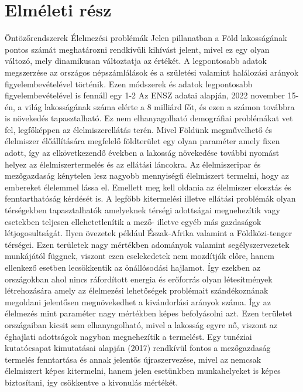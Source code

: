 \documentclass[a4paper,oneside,onecolumn,12pt]{LegrandOrangeBook}
\begin{document}
\chapter{Elméleti rész}
Öntözőrendszerek
Élelmezési problémák
	Jelen pillanatban a Föld lakosságának pontos számát meghatározni rendkívüli kihívást jelent, mivel ez egy olyan változó, mely dinamikusan változtatja az értékét. A legpontosabb adatok megszerzése az országos népszámlálások és a születési valamint halálozási arányok figyelembevételével történik. Ezen módszerek és adatok legpontosabb figyelembevételével is fennáll egy 1-2%
	Az ENSZ adatai alapján, 2022 november 15-én, a világ lakosságának száma elérte a 8 milliárd főt, és ezen a számon továbbra is növekedés tapasztalható. Ez nem elhanyagolható demográfiai problémákat vet fel, legfőképpen az élelmiszerellátás terén. 
	Mivel Földünk megművelhető és élelmiszer élőállítására megfelelő földterület egy olyan paraméter amely fixen adott, így az elkövetkezendő években a lakosság növekedése további nyomást helyez az élelmiszertermelés és az ellátási láncokra. Az élelmiszeripar és mezőgazdaság kénytelen lesz nagyobb mennyiségű élelmiszert termelni, hogy az embereket élelemmel lássa el. Emellett meg kell oldania az élelmiszer elosztás és fenntarthatóság kérdését is. 
	A legfőbb kitermelési illetve ellátási problémák olyan térségekben tapasztalhatók amelyeknek térségi adottságai megnehezítik vagy esetekben teljesen ellehetetlenítik a mező- illetve egyéb más gazdaságok létjogosultságát. Ilyen övezetek például Észak-Afrika valamint a Földközi-tenger térségei. Ezen területek nagy mértékben adományok valamint segélyszervezetek munkájától  függnek, viszont ezen cselekedetek nem mozdítják előre, hanem ellenkező esetben lecsökkentik az önállósodási hajlamot. Így ezekben az országokban ahol nincs ráfordított energia és erőforrás olyan létesítmények létrehozására amely az élelmezési lehetőségek problémait szándékoznának megoldani jelentősen megnövekedhet a kivándorlási arányok száma. Így az élelmezés mint paraméter nagy mértékben képes befolyásolni azt. Ezen területet országaiban kicsit sem  elhanyagolható, mivel a lakosság egyre nő, viszont az éghajlati adottságok nagyban megnehezítik a termelést. Egy tunéziai kutatócsapat kimutatásai alapján (2017) rendkívül fontos a mezőgazdaság termelés fenntartása és annak jelentős újraszervezése, mivel az nemcsak élelmiszert képes kitermelni, hanem jelen esetünkben munkahelyeket is képes biztosítani, így csökkentve a kivonulás mértékét.  
\end{document}
